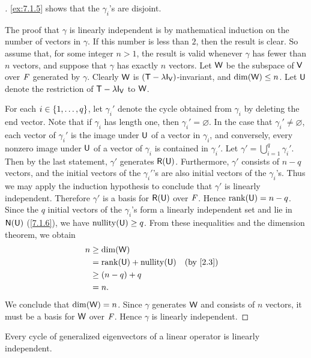 \begin{proof}[]
  \cref{ex:7.1.5} shows that the \(\gamma_i\)'s are disjoint.

  The proof that \(\gamma\) is linearly independent is by mathematical induction on the number of vectors in \(\gamma\).
  If this number is less than \(2\), then the result is clear.
  So assume that, for some integer \(n > 1\), the result is valid whenever \(\gamma\) has fewer than \(n\) vectors, and suppose that \(\gamma\) has exactly \(n\) vectors.
  Let \(\mathsf{W}\) be the subspace of \(\mathsf{V}\) over \(\mathit{F}\) generated by \(\gamma\).
  Clearly \(\mathsf{W}\) is \((\T - \lambda \IT[\V])\)-invariant, and \(\dim(\mathsf{W}) \leq n\).
  Let \(\mathsf{U}\) denote the restriction of \(\T - \lambda \IT[\V]\) to \(\mathsf{W}\).

  For each \(i \in \left\lbrace1, \dots, q\right\rbrace\), let \(\gamma_i'\) denote the cycle obtained from \(\gamma_i\) by deleting the end vector.
  Note that if \(\gamma_i\) has length one, then \(\gamma_i' = \varnothing\).
  In the case that \(\gamma_i' \neq \varnothing\), each vector of \(\gamma_i'\) is the image under \(\mathsf{U}\) of a vector in \(\gamma_i\), and conversely, every nonzero image under \(\mathsf{U}\) of a vector of \(\gamma_i\) is contained in \(\gamma_i'\).
  Let \(\gamma' = \bigcup_{i = 1}^q \gamma_i'\).
  Then by the last statement, \(\gamma'\) generates \(\rg{\U}\).
  Furthermore, \(\gamma'\) consists of \(n - q\) vectors, and the initial vectors of the \(\gamma_i'\)'s are also initial vectors of the \(\gamma_i\)'s.
  Thus we may apply the induction hypothesis to conclude that \(\gamma'\) is linearly independent.
  Therefore \(\gamma'\) is a basis for \(\rg{\U}\) over \(\mathit{F}\).
  Hence \(\rk{\U} = n - q\).
  Since the \(q\) initial vectors of the \(\gamma_i\)'s form a linearly independent set and lie in \(\ns{\U}\) (\cref{7.1.6}), we have \(\nt{\U} \geq q\).
  From these inequalities and the dimension theorem, we obtain
  \begin{align*}
    n & \geq \dim(\W)                     \\
      & = \rk{\U} + \nt{\U} &  & \by{2.3} \\
      & \geq (n - q) + q                  \\
      & = n.
  \end{align*}
  We conclude that \(\dim(\mathsf{W}) = n\).
  Since \(\gamma\) generates \(\mathsf{W}\) and consists of \(n\) vectors, it must be a basis for \(\mathsf{W}\) over \(\mathit{F}\).
  Hence \(\gamma\) is linearly independent.
\end{proof}

\begin{cor}\label{7.1.7}
  Every cycle of generalized eigenvectors of a linear operator is linearly independent.
\end{cor}

